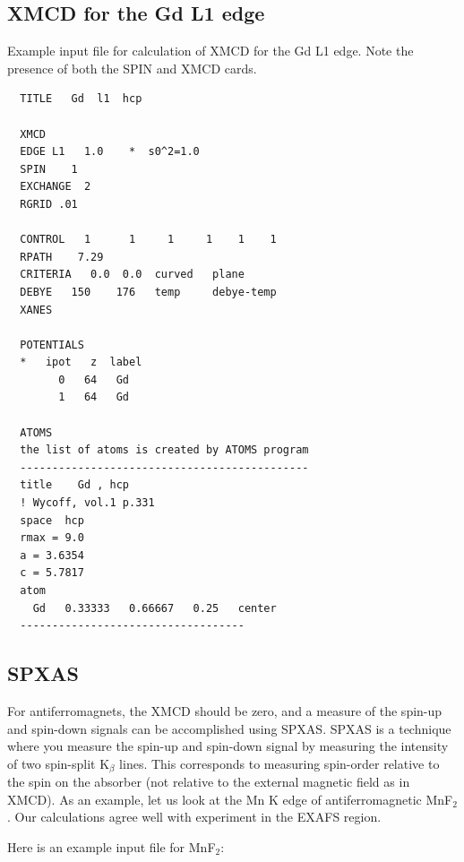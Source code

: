 \documentclass[11pt,oneside]{report} %
\renewcommand{\htmlref}[2]{\hyperlink{#2}{#1}}
\renewcommand{\htmlref}[2]{{#1}} %
\begin{document}
\subsection{XMCD for the Gd L1 edge}
\label{sec:XMCD-ex}
Example input file for calculation of XMCD for the Gd L1 edge. 
Note the presence of both the \htmlref{SPIN}{card:spi} and 
\htmlref{XMCD}{card:xnc} cards.

\begin{verbatim}
  TITLE   Gd  l1  hcp 
  
  XMCD
  EDGE L1   1.0    *  s0^2=1.0
  SPIN    1
  EXCHANGE  2
  RGRID .01
 
  CONTROL   1      1     1     1    1    1
  RPATH    7.29
  CRITERIA   0.0  0.0  curved   plane
  DEBYE   150    176   temp     debye-temp
  XANES
 
  POTENTIALS
  *   ipot   z  label
        0   64   Gd
        1   64   Gd
 
  ATOMS
  the list of atoms is created by ATOMS program
  ---------------------------------------------
  title    Gd , hcp
  ! Wycoff, vol.1 p.331
  space  hcp
  rmax = 9.0
  a = 3.6354
  c = 5.7817
  atom
    Gd   0.33333   0.66667   0.25   center
  -----------------------------------
\end{verbatim}



\subsection{SPXAS}
\label{sec:SPXAS}
For antiferromagnets, the XMCD should be zero, and a measure of the 
spin-up and spin-down signals can be accomplished using SPXAS. SPXAS 
is a technique where you measure the spin-up and spin-down signal by 
measuring the intensity of two spin-split K$_{\beta}$ lines. This 
corresponds to measuring spin-order relative to the spin on the absorber 
(not relative to the external magnetic field as in XMCD). As an example, 
let us look at the Mn K edge of antiferromagnetic MnF$_2$. Our calculations 
agree well with experiment in the EXAFS region.

Here is an example input file for MnF$_2$:
\end{document}
